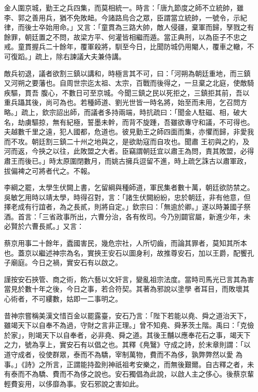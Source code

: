 \begin{pinyinscope}
 金人圍京城，勤王之兵四集，而莫相統一。時言：「唐九節度之師不立統帥，雖李、郭之善用兵，猶不免敗衄。今諸路烏合之眾，臣謂當立統帥，一號令，示紀
 律，而後士卒始用命。」又言：「童貫為三路大帥，敵人侵疆，棄軍而歸，孥戮之有餘罪，朝廷置之不問，故梁方平、何灌皆相繼而遁。當正典刑，以為臣子不忠之戒。童貫握兵二十餘年，覆軍殺將，馴至今日，比聞防城仍用閹人，覆車之轍，不可復蹈。」疏上，除右諫議大夫兼侍講。



 敵兵初退，議者欲割三鎮以講和，時極言其不可，曰：「河朔為朝廷重地，而三鎮又河朔之要藩也。自周世宗迄太祖、太宗，百戰而後得之，一旦棄之北庭，使敵騎疾驅，貫吾
 腹心，不數日可至京城。今聞三鎮之民以死拒之，三鎮拒其前，吾以重兵躡其後，尚可為也。若種師道、劉光世皆一時名將，始至而未用，乞召問方略。」疏上，欽宗詔出師，而議者多持兩端，時抗疏曰：「聞金人駐磁、相，破大名，劫虜驅掠，無有紀極，誓墨未幹，而背不旋踵，吾雖欲專守和議，不可得也。夫越數千里之遠，犯人國都，危道也。彼見勤王之師四面而集，亦懼而歸，非愛我而不攻。朝廷割三鎮二十州之地與之，是欲助寇而自攻也。聞肅
 王初與之約，及河而返，今挾之以往，此敗盟之大者。臣竊謂朝廷宜以肅王為問，責其敗盟，必得肅王而後已。」時太原圍閉數月，而姚古擁兵逗留不進，時上疏乞誅古以肅軍政，拔偏裨之可將者代之。不報。



 李綱之罷，太學生伏闕上書，乞留綱與種師道，軍民集者數十萬，朝廷欲防禁之。吳敏乞用時以靖太學，時得召對，言：「諸生伏闕紛紛，忠於朝廷，非有他意，但擇老成有行誼者，為之長貳，則將自定。」欽宗曰：「無逾於卿。」遂以時兼國子祭
 酒。首言：「三省政事所出，六曹分治，各有攸司。今乃別闢官屬，新進少年，未必賢於六曹長貳。」又言：



 蔡京用事二十餘年，蠹國害民，幾危宗社，人所切齒，而論其罪者，莫知其所本也。蓋京以繼述神宗為名，實挾王安石以圖身利，故推尊安石，加以王爵，配饗孔子廟庭。今日之禍，實安石有以啟之。



 謹按安石挾管、商之術，飭六藝以文奸言，變亂祖宗法度。當時司馬光已言其為害當見於數十年之後，今日之事，若合符契。其著為邪說以塗學
 者耳目，而敗壞其心術者，不可縷數，姑即一二事明之。



 昔神宗嘗稱美漢文惜百金以罷露臺，安石乃言：「陛下若能以堯、舜之道治天下，雖竭天下以自奉不為過，守財之言非正理。」曾不知堯、舜茅茨土階。禹曰：「克儉於家」，則竭天下以自奉者，必非堯、舜之道。其後王黼以應奉花石之事，竭天下之力，號為享上，實安石有以倡之也。其釋《鳧鷖》守成之詩，於末章則謂：「以道守成者，役使群眾，泰而不為驕，宰制萬物，費而不為侈，孰弊弊然以愛
 為事。」《詩》之所言，正謂能持盈則神祇祖考安樂之，而無後艱爾。自古釋之者，未有泰而不為驕、費而不為侈之說也。安石獨倡為此說，以啟人主之侈心。後蔡京輩輕費妄用，以侈靡為事。安石邪說之害如此。




\end{pinyinscope}

